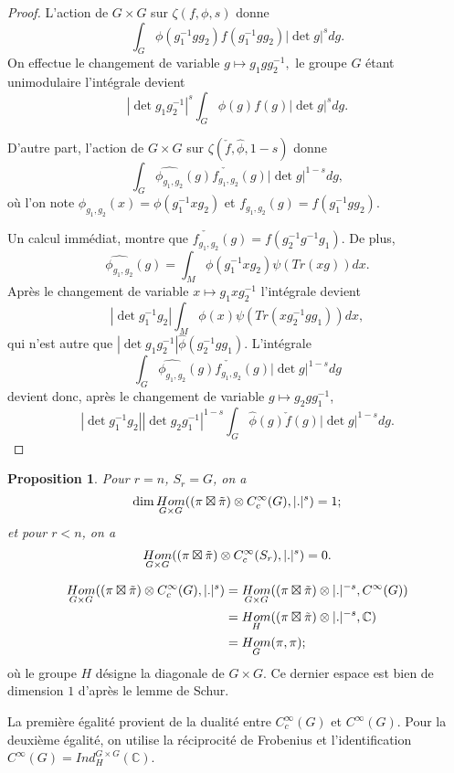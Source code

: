 \documentclass{amsart}
\newtheorem{proposition}{Proposition}
\DeclareMathOperator{\Hom}{\mathnormal{Hom}}
\begin{document}
\begin{proof}
L'action de $G \times G$ sur $\zeta(f,\phi,s)$ donne
$$\int_G \phi(g_1^{-1}gg_2)f(g_1^{-1}gg_2)|\det g|^s dg.$$
On effectue le changement de variable $g \mapsto g_1gg_2^{-1},$ le groupe $G$ étant unimodulaire l'intégrale devient
$$|\det g_1g_2^{-1}|^s\int_G \phi(g)f(g)|\det g|^s dg.$$

D'autre part, l'action de $G \times G$ sur $\zeta(\check{f}, \hat{\phi}, 1-s)$ donne
$$\int_G \hat{\phi_{g_1,g_2}}(g)\check{f_{g_1,g_2}}(g)|\det g|^{1-s} dg,$$
où l'on note $\phi_{g_1,g_2}(x) = \phi(g_1^{-1}xg_2)$ et $f_{g_1,g_2}(g) = f(g_1^{-1}gg_2).$

Un calcul immédiat, montre que $\check{f_{g_1,g_2}}(g) = f(g_2^{-1}g^{-1}g_1)$. De plus,
$$\hat{\phi_{g_1,g_2}}(g) = \int_M \phi(g_1^{-1}xg_2) \psi(Tr(xg)) dx.$$
Après le changement de variable $x \mapsto g_1xg_2^{-1}$ l'intégrale devient
$$|\det g_1^{-1}g_2|\int_M \phi(x) \psi(Tr(xg_2^{-1}gg_1)) dx,$$
qui n'est autre que $|\det g_1g_2^{-1}|\hat{\phi}(g_2^{-1}gg_1)$.
L'intégrale
$$\int_G \hat{\phi_{g_1,g_2}}(g)\check{f_{g_1,g_2}}(g)|\det g|^{1-s} dg$$
devient donc, après le changement de variable $g \mapsto g_2gg_1^{-1}$,
$$|\det g_1^{-1}g_2||\det g_2g_1^{-1}|^{1-s}\int_G \hat{\phi}(g)\check{f}(g)|\det g|^{1-s} dg.$$
\end{proof}

\begin{proposition}
Pour $r=n$, $S_r = G$, on a
$$\dim \Hom_{G \times G} ( (\pi \boxtimes \tilde{\pi}) \otimes C_{c}^\infty(G), |.|^s) = 1;$$
et pour $r < n$, on a
$$\Hom_{G \times G} ( (\pi \boxtimes \tilde{\pi}) \otimes C_{c}^\infty(S_r), |.|^s) = 0.$$
\end{proposition}

\begin{align*}
\Hom_{G \times G}( (\pi \boxtimes \tilde{\pi}) \otimes C_c^\infty(G), |.|^s) &= \Hom_{G \times G}( (\pi \boxtimes \tilde{\pi}) \otimes |.|^{-s}, C^\infty(G)) \\
&= \Hom_H( (\pi \boxtimes \tilde{\pi}) \otimes |.|^{-s}, \mathbb{C}) \\
&= \Hom_G(\pi, \pi);
\end{align*}
où le groupe $H$ désigne la diagonale de $G \times G$. Ce dernier espace est bien de dimension $1$ d'après le lemme de Schur.

La première égalité provient de la dualité entre $C_c^\infty(G)$ et $C^\infty(G)$. Pour la deuxième égalité, on utilise la réciprocité de Frobenius et l'identification $C^\infty(G) = Ind_H^{G \times G}(\mathbb{C})$.
\end{document}
